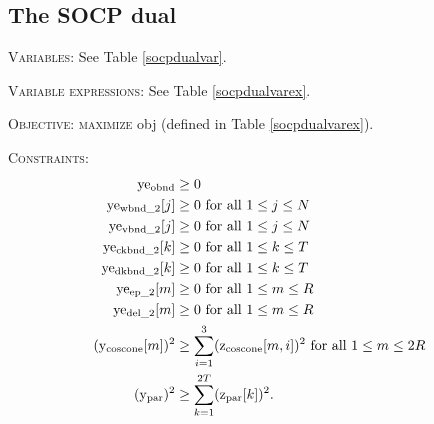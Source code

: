 \documentclass[12pt]{article}
\numberwithin{equation}{section}
\begin{document}
\clearpage

\subsection{The SOCP dual}\label{socpdual}

\noindent\textsc{Variables: } See Table \ref{socpdualvar}.

\vspace{0.15cm}


\noindent\textsc{Variable expressions: } See Table \ref{socpdualvarex}.

\vspace{0.15cm}

\noindent\textsc{Objective: maximize} obj (defined in Table \ref{socpdualvarex}). 

\vspace{0.15cm}


\noindent\textsc{Constraints: } \begin{align*}  \text{ye\textsubscript{obnd}} & \geq 0 \\
\text{ye\textsubscript{wbnd\_2}}[j] & \geq 0 \text{ for all } 1 \leq j \leq N \\
\text{ye\textsubscript{vbnd\_2}}[j] & \geq 0 \text{ for all } 1 \leq j \leq N \\
\text{ye\textsubscript{ckbnd\_2}}[k] & \geq 0 \text{ for all } 1 \leq k \leq T \\
\text{ye\textsubscript{dkbnd\_2}}[k] & \geq 0 \text{ for all } 1 \leq k \leq T \\
\text{ye\textsubscript{ep\_2}}[m] & \geq 0 \text{ for all } 1 \leq m \leq R \\
\text{ye\textsubscript{del\_2}}[m] & \geq 0 \text{ for all } 1 \leq m \leq R \\
 (\text{y\textsubscript{coscone}}[m])^2 & \geq \sum_{i=1}^3 ( \text{z\textsubscript{coscone}}[m,i] )^2 \text{ for all } 1 \leq m \leq 2R\\
  (\text{y\textsubscript{par}})^2 & \geq \sum_{k=1}^{2T} ( \text{z\textsubscript{par}}[k] )^2 . 
\end{align*}





\renewcommand{\arraystretch}{1.5}
\end{document}
